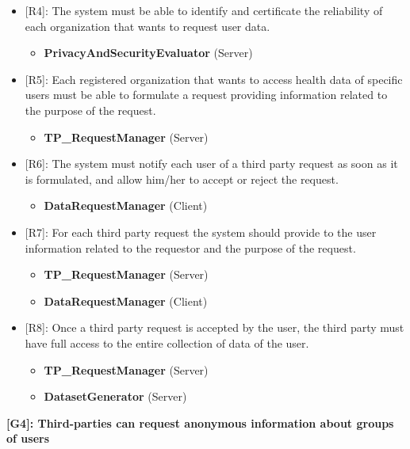 \begin{itemize}
	\item {[R4]: The system must be able to identify and certificate the reliability of each organization that wants to request user data.}
	\begin{itemize}
		\item {\textbf{PrivacyAndSecurityEvaluator} (Server)}
	\end{itemize}   
	\item {[R5]: Each registered organization that wants to access health data of specific users must be able to formulate a request providing information related to the purpose of the request.}
	\begin{itemize}
		\item {\textbf{TP\_RequestManager} (Server)}
	\end{itemize}   
	\item {[R6]: The system must notify each user of a third party request as soon as it is formulated, and allow him/her to accept or reject the request.}
	\begin{itemize}
		\item {\textbf{DataRequestManager} (Client)}
	\end{itemize}   
	\item {[R7]: For each third party request the system should provide to the user information related to the requestor and the purpose of the request.}
	\begin{itemize}
		\item {\textbf{TP\_RequestManager} (Server)}
		\item {\textbf{DataRequestManager} (Client)}
	\end{itemize}   
	\item {[R8]: Once a third party request is accepted by the user, the third party must have full access to the entire collection of data of the user.}
	\begin{itemize}
		\item {\textbf{TP\_RequestManager} (Server)}
		\item {\textbf{DatasetGenerator} (Server)}
	\end{itemize}   
\end{itemize}

\textbf{[G4]: Third-parties can request anonymous information about groups of users}

